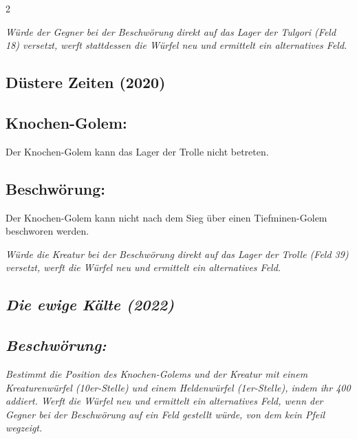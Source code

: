 \documentclass[10pt, a4paper, oneside]{book}
\newcommand{\fan}[1]{\textit{#1}}
\begin{document}
\begin{multicols*}{2}
\begin{bgcolor}[color-AG]
\fan{Würde der Gegner bei der Beschwörung direkt auf das Lager der Tulgori (Feld 18) versetzt, werft stattdessen die Würfel neu und ermittelt ein alternatives Feld.}

\end{bgcolor}


\begin{bgcolor}[color-DZ]
\section{Düstere Zeiten (2020)}



\subsection{Knochen-Golem:}

Der Knochen-Golem kann das Lager der Trolle nicht betreten.
\supercite{DZ:Begleitheft}



\subsection{Beschwörung:}

Der Knochen-Golem kann nicht nach dem Sieg über einen Tiefminen-Golem beschworen werden.
\supercite{DZ:Begleitheft}

\fan{Würde die Kreatur bei der Beschwörung direkt auf das Lager der Trolle (Feld 39) versetzt, werft die Würfel neu und ermittelt ein alternatives Feld.}


\end{bgcolor}



\begin{bgcolor}
\section{\fan{Die ewige Kälte (2022)}}

\subsection{\fan{Beschwörung:}}

\fan{Bestimmt die Position des Knochen-Golems und der Kreatur mit einem Kreaturenwürfel (10er-Stelle) und einem Heldenwürfel (1er-Stelle), indem ihr 400 addiert. Werft die Würfel neu und ermittelt ein alternatives Feld, wenn der Gegner bei der Beschwörung auf ein Feld gestellt würde, von dem kein Pfeil wegzeigt.}



\end{bgcolor}
\end{multicols*}
\end{document}
